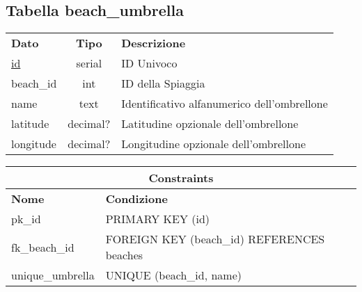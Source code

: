 \begin{center}
    \subsection*{Tabella \textnormal{beach\_umbrella}}
    
    \begin{tabularx}{\textwidth}{l c X}
        \toprule
        \textbf{Dato} & \textbf{Tipo} & \textbf{Descrizione}\\
        \underline{id} & serial & ID Univoco \\
        beach\_id & int & ID della Spiaggia\\
        name & text & Identificativo alfanumerico dell'ombrellone\\
        latitude & decimal? & Latitudine opzionale dell'ombrellone\\
        longitude & decimal? & Longitudine opzionale dell'ombrellone\\
        \midrule
    \end{tabularx}
    \begin{tabularx}{\textwidth}{l X}
        \multicolumn{2}{c}{\textbf{Constraints}}\\
        \midrule
        \textbf{Nome} & \textbf{Condizione}\\
        pk\_id & PRIMARY KEY (id)\\
        fk\_beach\_id & FOREIGN KEY (beach\_id) REFERENCES beaches\\
        unique\_umbrella & UNIQUE (beach\_id, name)\\
        \bottomrule
    \end{tabularx}
    \bigskip
\end{center}

